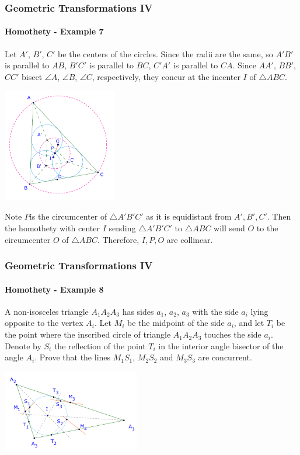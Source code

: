 \documentclass[8pt,xcolor=table,dvipsnames]{beamer}
\begin{document}
\begin{frame}[t]
    \frametitle{Geometric Transformations IV}
    \framesubtitle{Homothety - Example 7}
    Let $A'$, $B'$, $C'$ be the centers of the circles. Since the radii are the same, so $A'B'$ is parallel to $AB$, $B'C'$ is parallel to $BC$, $C'A'$ is parallel to $CA$.
    Since $AA'$, $BB'$, $CC'$ bisect $\angle A$, $\angle B$, $\angle C$, respectively, they concur at the incenter $I$ of $\triangle ABC.$
    \begin{center}
        \includegraphics[width=5cm]{./svg/pdf/homothety-p7b.pdf}
    \end{center}
    Note $P$is the circumcenter of $\triangle A'B'C'$ as it is equidistant from $A', B', C'$.
    Then the homothety with center $I$ sending $\triangle A'B'C'$ to $\triangle ABC$ will send $O$ to the circumcenter $O$ of $\triangle ABC.$
    Therefore, $I, P, O$ are collinear.
\end{frame}

\begin{frame}[t]
    \frametitle{Geometric Transformations IV}
    \framesubtitle{Homothety - Example 8}
    \begin{example}
        A non-isosceles triangle $A_{1}A_{2}A_{3}$ has sides $a_{1}$, $a_{2}$, $a_{3}$
        with the side $a_{i}$ lying opposite to the vertex $A_{i}$.
        Let $M_{i}$ be the midpoint of the side $a_{i}$,
        and let $T_{i}$ be the point
        where the inscribed circle of triangle $A_{1}A_{2}A_{3}$ touches the side $a_{i}$.
        Denote by $S_{i}$ the reflection of the point $T_{i}$
        in the interior angle bisector of the angle $A_{i}$.
        \bigbreak
        Prove that the lines $M_{1}S_{1}$, $M_{2}S_{2}$ and $M_{3}S_{3}$ are concurrent.
    \end{example}
    \begin{center}
        \includegraphics[width=6cm]{./svg/pdf/homothety-p8a.pdf}
    \end{center}
\end{frame}
\end{document}
